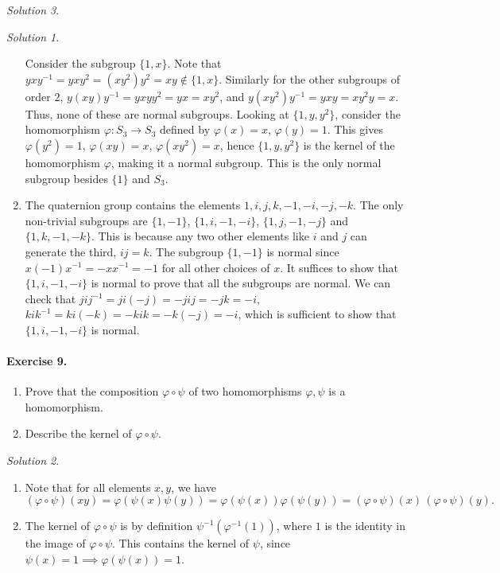 \documentclass[11pt]{report}
\theoremstyle{remark}
\newtheorem*{solution}{Solution}
\begin{document}
\begin{solution}
\begin{solution}
\begin{enumerate}
        Consider the subgroup $\{1, x\}$. Note that $yxy^{-1} = yxy^2 = (xy^2)y^2 =
        xy \notin \{1, x\}$. Similarly for the other subgroups of order $2$,
        $y(xy)y^{-1} = yxy y^2 = yx = xy^2$, and $y(xy^2)y^{-1} = yxy = xy^2y = x$.
        Thus, none of these are normal subgroups. Looking at $\{1, y, y^2\}$,
        consider the homomorphism $\varphi\colon S_3 \to S_3$ defined by $\varphi(x)
        = x$, $\varphi(y) = 1$. This gives $\varphi(y^2) = 1$, $\varphi(xy) = x$,
        $\varphi(xy^2) = x$, hence $\{1, y, y^2\}$ is the kernel of the homomorphism
        $\varphi$, making it a normal subgroup. This is the only normal subgroup
        besides $\{1\}$ and $S_3$.

        \item The quaternion group contains the elements $1, i, j, k, -1, -i, -j,
        -k$. The only non-trivial subgroups are $\{1, -1\}$, $\{1, i, -1, -i\}$,
        $\{1, j, -1, -j\}$ and $\{1, k, -1, -k\}$. This is because any two other
        elements like $i$ and $j$ can generate the third, $ij = k$. The subgroup
        $\{1, -1\}$ is normal since $x(-1)x^{-1} = -x x^{-1} = -1$ for all other
        choices of $x$. It suffices to show that $\{1, i, -1, -i\}$ is normal to
        prove that all the subgroups are normal. We can check that $jij^{-1} =
        ji(-j) = -jij = -jk = -i$, $kik^{-1} = ki(-k) = -kik = -k(-j) = -i$, which
        is sufficient to show that $\{1, i, -1, -i\}$ is normal.
    \end{enumerate}
    \end{solution} 
    
    \paragraph{Exercise 9.} \mbox{}
    \begin{enumerate}
        \itemsep0em 
        \item Prove that the composition $\varphi\circ \psi$ of two homomorphisms
        $\varphi, \psi$ is a homomorphism.
        \item Describe the kernel of $\varphi\circ\psi$.
    \end{enumerate}
    \begin{solution} \mbox{}
    \begin{enumerate}
        \item Note that for all elements $x, y$, we have \[
            (\varphi\circ\psi)(xy) = \varphi(\psi(x)\psi(y)) =
            \varphi(\psi(x))\varphi(\psi(y)) = (\varphi\circ \psi)(x)\,
            (\varphi\circ \psi)(y).
        \] 
        \item The kernel of $\varphi\circ \psi$ is by definition
        $\psi^{-1}(\varphi^{-1}(1))$, where $1$ is the identity in the image of
        $\varphi \circ \psi$. This contains the kernel of $\psi$, since $\psi(x) = 1
        \implies \varphi(\psi(x)) = 1$.
    \end{enumerate}
    \end{solution}
    

\end{solution}
\end{document}
